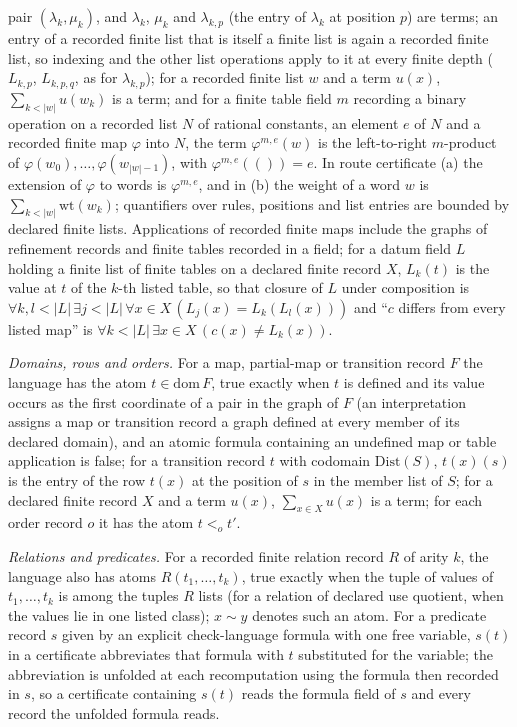 pair \((\lambda_k,\mu_k)\), and \(\lambda_k\), \(\mu_k\) and \(\lambda_{k,p}\) (the entry of
\(\lambda_k\) at position \(p\)) are terms; an entry of a recorded finite list that is itself a
finite list is again a recorded finite list, so indexing and the other list
operations apply to it at every finite depth (\(L_{k,p}\), \(L_{k,p,q}\), as for
\(\lambda_{k,p}\)); for a recorded finite list \(w\) and a term
\(u(x)\), \(\sum_{k<|w|}u(w_k)\) is a term; and for a finite table field \(m\)
recording a binary operation on a recorded list \(N\) of rational constants,
an element \(e\) of \(N\) and a recorded finite map \(\varphi\) into \(N\), the
term \(\varphi^{m,e}(w)\) is the left-to-right \(m\)-product of
\(\varphi(w_0),\dots,\varphi(w_{|w|-1})\), with \(\varphi^{m,e}(())=e\). In route
certificate (a) the extension of \(\varphi\) to words is \(\varphi^{m,e}\), and in
(b) the weight of a word \(w\) is \(\sum_{k<|w|}\mathrm{wt}(w_k)\); quantifiers over rules, positions and list
entries are bounded by declared finite lists. Applications of recorded finite
maps include the graphs of refinement records and finite tables recorded in a
field; for a datum field \(L\) holding a finite list of finite tables on a
declared finite record \(X\), \(L_k(t)\) is the value at \(t\) of the \(k\)-th
listed table, so that closure of \(L\) under composition is
\(\forall k,l<|L|\,\exists j<|L|\,\forall x\in X\,(L_j(x)=L_k(L_l(x)))\) and ``\(c\)
differs from every listed map'' is
\(\forall k<|L|\,\exists x\in X\,(c(x)\neq L_k(x))\). \par\emph{Domains, rows and orders.} For a map, partial-map or transition record \(F\) the language has the atom
\(t\in\mathrm{dom}\,F\), true exactly when \(t\) is defined and its value
occurs as the first coordinate of a pair in the graph of \(F\) (an
interpretation assigns a map or transition record a graph defined at every
member of its declared domain), and an atomic formula containing an undefined
map or table application is false; for a transition record \(t\) with
codomain \(\mathrm{Dist}(S)\), \(t(x)(s)\) is the entry of the row \(t(x)\)
at the position of \(s\) in the member list of \(S\); for a declared finite record \(X\) and a term \(u(x)\),
\(\sum_{x\in X}u(x)\) is a term; for each order record \(o\) it has the atom
\(t<_o t'\).
\par\emph{Relations and predicates.} For a recorded finite relation record \(R\)
of arity \(k\), the language also has atoms \(R(t_1,\dots,t_k)\), true exactly
when the tuple of values of \(t_1,\dots,t_k\) is among the tuples \(R\) lists
(for a relation of declared use quotient, when the values lie in one listed
class); \(x\sim y\) denotes such an atom. For a predicate record \(s\) given by
an explicit check-language formula with one free variable, \(s(t)\) in a
certificate abbreviates that formula with \(t\) substituted for the variable; the abbreviation is unfolded at each recomputation using the formula then recorded in \(s\), so a certificate containing \(s(t)\) reads the formula field of \(s\) and every record the unfolded formula reads.

